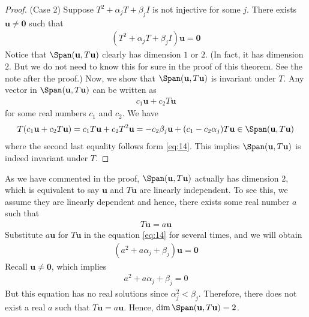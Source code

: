 \documentclass[thmcnt=section, color=blue, 12pt]{my-elegantbook}
\begin{document}
\begin{proof}
    \par (Case 2) Suppose $T^2 + \alpha_j T + \beta_j I$ is not injective for some $j$. There exists $\mathbf{u} \neq \mathbf{0}$ such that
    \begin{align}
        (T^2 + \alpha_j T + \beta_j I) \mathbf{u} = \mathbf{0}
        \label{eq:14}
    \end{align}
    Notice that $\Span(\mathbf{u}, T \mathbf{u})$ clearly has dimension $1$ or $2$. (In fact, it has dimension $2$. But we do not need to know this for sure in the proof of this theorem. See the note after the proof.) Now, we show that $\Span(\mathbf{u}, T \mathbf{u})$ is invariant under $T$. Any vector in $\Span(\mathbf{u}, T \mathbf{u})$ can be written as 
    \begin{align*}
        c_1 \mathbf{u} + c_2 T \mathbf{u}
    \end{align*}
    for some real numbers $c_1$ and $c_2$. We have 
    \begin{align*}
        T (c_1 \mathbf{u} + c_2 T \mathbf{u})
        = c_1 T \mathbf{u} + c_2 T^2 \mathbf{u}
        = -c_2 \beta_j \mathbf{u} + (c_1 - c_2 \alpha_j) T \mathbf{u}
        \in \Span(\mathbf{u}, T \mathbf{u})
    \end{align*}
    where the second last equality follows form \eqref{eq:14}. This implies $\Span(\mathbf{u}, T \mathbf{u})$ is indeed invariant under $T$.
\end{proof}

\begin{note}
    As we have commented in the proof, $\Span(\mathbf{u}, T \mathbf{u})$ actually has dimension $2$, which is equivalent to say $\mathbf{u}$ and $T \mathbf{u}$ are linearly independent. To see this, we assume they are linearly dependent and hence, there exists some real number $a$ such that
    \begin{align*}
        T \mathbf{u} = a \mathbf{u}
    \end{align*}
    Substitute $a \mathbf{u}$ for $T \mathbf{u}$ in the equation \eqref{eq:14} for several times, and we will obtain 
    \begin{align*}
        (a^2 + a\alpha_j + \beta_j) \mathbf{u} = \mathbf{0}
    \end{align*}
    Recall $\mathbf{u} \neq \mathbf{0}$, which implies
    \begin{align*}
        a^2 + a\alpha_j + \beta_j = 0
    \end{align*}
    But this equation has no real solutions since $\alpha_j^2 < \beta_j$. Therefore, there does not exist a real $a$ such that $T \mathbf{u} = a \mathbf{u}$. Hence, $\dim \Span(\mathbf{u}, T \mathbf{u}) = 2$.
\end{note}
\end{document}
